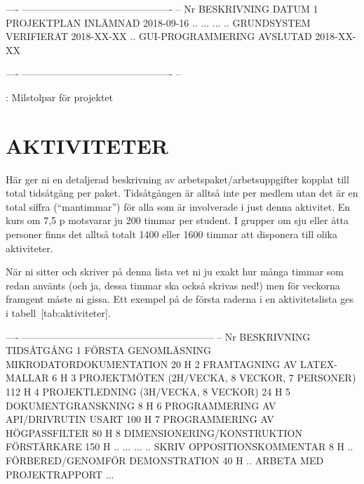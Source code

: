 \documentclass[a4paper]{article}
\begin{document}
  ---- ---------------------------------------------- --
  Nr   BESKRIVNING  DATUM                            
       1  PROJEKTPLAN INLÄMNAD  2018-09-16          
       ..  ...  ...                                 
       ..  GRUNDSYSTEM VERIFIERAT  2018-XX-XX       
       ..  GUI-PROGRAMMERING AVSLUTAD  2018-XX-XX   
                                                      
  ---- ---------------------------------------------- --

  : Milstolpar för projektet



\section{AKTIVITETER}


Här ger ni en detaljerad beskrivning av arbetspaket/arbetsuppgifter
kopplat till total tidsåtgång per paket. Tidsåtgången är alltså inte per
medlem utan det är en total siffra (“mantimmar”) för alla som är
involverade i just denna aktivitet. En kurs om 7,5 p motsvarar ju 200
timmar per student. I grupper om sju eller åtta personer finns det
alltså totalt 1400 eller 1600 timmar att disponera till olika
aktiviteter.

När ni sitter och skriver på denna lista vet ni ju exakt hur många
timmar som redan använts (och ja, dessa timmar ska också skrivas ned!)
men för veckorna framgent måste ni gissa. Ett exempel på de första
raderna i en aktivitetslista ges i tabell [tab:aktiviteter].

  ---- ----------------------------------------------------------- --
  Nr   BESKRIVNING  TIDSÅTGÅNG                                    
       1  FÖRSTA GENOMLÄSNING MIKRODATORDOKUMENTATION  20 H      
       2  FRAMTAGNING AV LATEX-MALLAR  6 H                       
       3  PROJEKTMÖTEN (2H/VECKA, 8 VECKOR, 7 PERSONER)  112 H   
       4  PROJEKTLEDNING (3H/VECKA, 8 VECKOR)  24 H              
       5  DOKUMENTGRANSKNING  8 H                                
       6  PROGRAMMERING AV API/DRIVRUTIN USART  100 H            
       7  PROGRAMMERING AV HÖGPASSFILTER  80 H                   
       8  DIMENSIONERING/KONSTRUKTION FÖRSTÄRKARE  150 H         
       ..  ...  ...                                              
       ..  SKRIV OPPOSITIONSKOMMENTAR  8 H                       
       ..  FÖRBERED/GENOMFÖR DEMONSTRATION  40 H                 
       ..  ARBETA MED PROJEKTRAPPORT  ...                        
                                                                   
\end{document}

